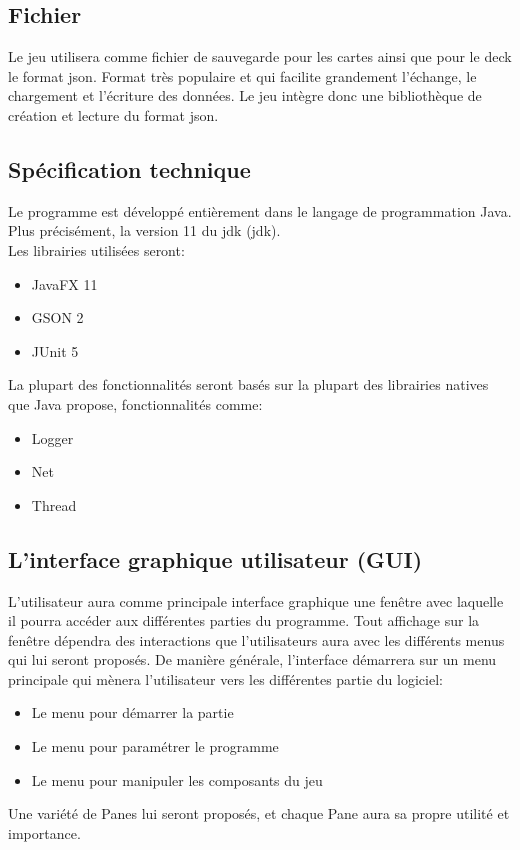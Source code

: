 \subsection{Fichier}
Le jeu utilisera comme fichier de sauvegarde pour les cartes ainsi que pour le deck le format \acrshort{json}. Format très populaire et qui facilite grandement l'échange, le chargement et l'écriture des données. Le jeu intègre donc une bibliothèque 
de création et lecture du format \acrshort{json}.

\subsection{Spécification technique}
Le programme est développé entièrement dans le langage de programmation Java. Plus précisément, la version 11 du \acrshort{jdk}  (\acrlong{jdk}).\\
Les librairies utilisées seront:
\begin{itemize}
	\item JavaFX 11
	\item GSON 2
	\item JUnit 5
\end{itemize}
La plupart des fonctionnalités seront basés sur la plupart des librairies natives que Java propose, fonctionnalités comme:
\begin{itemize}
	\item Logger
	\item Net
	\item Thread
\end{itemize}

\subsection{L'interface graphique utilisateur (GUI)}
L'utilisateur aura comme principale interface graphique une fenêtre avec laquelle il pourra accéder aux différentes parties du programme. Tout affichage sur la fenêtre dépendra des interactions que l'utilisateurs aura avec les différents menus qui lui seront proposés. De manière générale, l'interface démarrera sur un menu principale qui mènera l'utilisateur vers les différentes partie du logiciel:
\begin{itemize}
	\item Le menu pour démarrer la partie
	\item Le menu pour paramétrer le programme
	\item Le menu pour manipuler les composants du jeu
\end{itemize}
Une variété de Panes lui seront proposés, et chaque Pane aura sa propre utilité et importance.
